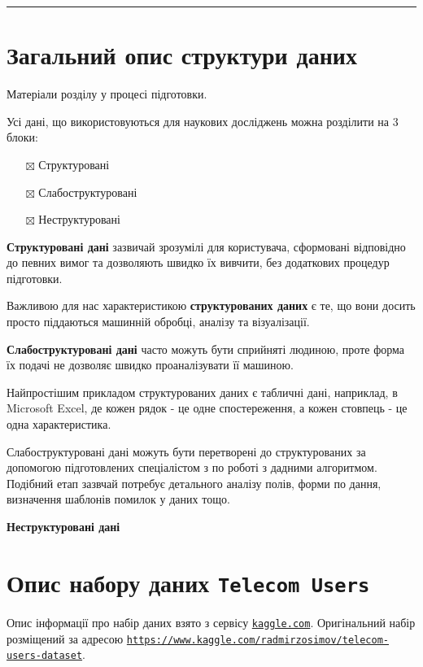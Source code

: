 \documentclass[
]{book}
\providecommand{\tightlist}{%
  \setlength{\itemsep}{0pt}\setlength{\parskip}{0pt}}
\begin{document}
\begin{center}\rule{0.5\linewidth}{0.5pt}\end{center}

\hypertarget{chapter41}{%
\section{Загальний опис структури даних}\label{chapter41}}

Матеріали розділу у процесі підготовки.

Усі дані, що використовуються для наукових досліджень можна розділити на 3 блоки:

\begin{itemize}
\tightlist
\item[$\boxtimes$]
  Структуровані
\item[$\boxtimes$]
  Слабоструктуровані
\item[$\boxtimes$]
  Неструктуровані
\end{itemize}

\textbf{Структуровані дані} зазвичай зрозумілі для користувача, сформовані відповідно до певних вимог та дозволяють швидко їх вивчити, без додаткових процедур підготовки.

Важливою для нас характеристикою \textbf{структурованих даних} є те, що вони досить просто піддаються машинній обробці, аналізу та візуалізації.

\textbf{Слабоструктуровані дані} часто можуть бути сприйняті людиною, проте форма їх подачі не дозволяє швидко проаналізувати її машиною.

Найпростішим прикладом структурованих даних є табличні дані, наприклад, в Microsoft Excel, де кожен рядок - це одне спостереження, а кожен стовпець - це одна характеристика.

Слабоструктуровані дані можуть бути перетворені до структурованих за допомогою підготовлених спеціалістом з по роботі з дадними алгоритмом. Подібний етап зазвчай потребує детального аналізу полів, форми по дання, визначення шаблонів помилок у даних тощо.

\textbf{Неструктуровані дані}

\hypertarget{chapter42}{%
\section{\texorpdfstring{Опис набору даних \texttt{Telecom\ Users}}{Опис набору даних Telecom Users}}\label{chapter42}}

Опис інформації про набір даних взято з сервісу \href{https://kaggle.com}{\texttt{kaggle.com}}.
Оригінальний набір розміщений за адресою \href{https://www.kaggle.com/radmirzosimov/telecom-users-dataset}{\texttt{https://www.kaggle.com/radmirzosimov/telecom-users-dataset}}.
\end{document}
